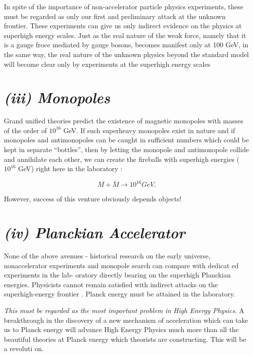 In spite of the importance of non-accelerator
particle physics experiments, these must
be regarded as only our first and preliminary
attack at the unknown frontier. These
experiments can give us only indirect evidence
on the physics at superhigh energy scales.
Just as the real nature of the weak force, namely
that it is a gauge froce mediated by
gauge bosons, becomes manifest only at 100 GeV, in
the same way, the real nature of the
unknown physics beyond the standard model
will become clear only by experiments at
the superhigh energy scales

\section*{\it (iii) Monopoles}


Grand unified theories predict the existence of magnetic
monopoles with masses of
the order of $10^{16}$ GeV. If such superheavy monopoles
exist in nature and if monopoles
and antimonopoles can be caught in sufficient numbers which
could be kept in separate
“bottles”,
then
by letting the monopole
and antimonopole
collide and annihilate each
other, we can create the fireballs with superhigh energies (~ $10^{16}$
GeV) right here in the
laboratory :
\newpage



$$
M + \bar{M} \rightarrow 10^{16} GeV.
$$



However, success of this venture obviously depends
objects!

\section*{\it (iv) Planckian Accelerator}


None of the above avenues - historical research on the early
universe, nonaccelerator
experiments and monopole search can compare with dedicat
ed experiments in the lab-
oratory directly bearing on the superhigh Planckian energies.
Physicists cannot remain
satisfied with indirect attacks on the superhigh-energy frontier
. Planck energy must be
attained in the laboratory.

{\it This must be regarded as the most important problem in High
Energy Physics}. A
breakthrough in the discovery of a new mechanism of acceleration
which can take us to
Planck energy will advance High Energy Physics much more than all
the beautiful theories
at Planck energy which theorists are constructing. This will be a revoluti
on.

